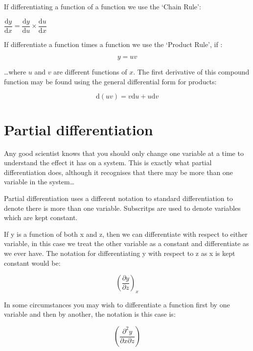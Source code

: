 \documentclass[
]{book}
\begin{document}
If differentiating a function of a function we use the `Chain Rule':

\(\dfrac{\textrm{d}y}{\textrm{d}x}=\dfrac{\textrm{d}y}{\textrm{d}u} \times \dfrac{\textrm{d}u}{\textrm{d}x}\)

If differentiate a function times a function we use the `Product Rule', if :

\begin{equation*}
y= uv
\end{equation*}

\ldots where \(u\) and \(v\) are different functions of \(x\). The first derivative of this compound function may be found using the general differential form for products:

\begin{equation}
\textrm{d}(uv) = v\textrm{d}u + u\textrm{d}v
\label{eq:productrule}
\end{equation}

\hypertarget{partial-differentiation}{%
\section{Partial differentiation}\label{partial-differentiation}}

Any good scientist knows that you should only change one variable at a time to understand the effect it has on a system. This is exactly what partial differentiation does, although it recognises that there may be more than one variable in the system\ldots{}

Partial differentiation uses a different notation to standard differentiation to denote there is more than one variable. Subscritps are used to denote variables which are kept constant.

If y is a function of both x and z, then we can differentiate with respect to either variable, in this case we treat the other variable as a constant and differentiate as we ever have. The notation for differentiating y with respect to z as x is kept constant would be:

\begin{equation*}
\left(\frac{\partial y}{\partial z}\right)_x
\end{equation*}

In some circumstances you may wish to differentiate a function first by one variable and then by another, the notation is this case is:

\begin{equation*}
\left(\frac{\partial^2 y}{\partial x \partial z}\right)
\end{equation*}
\end{document}
